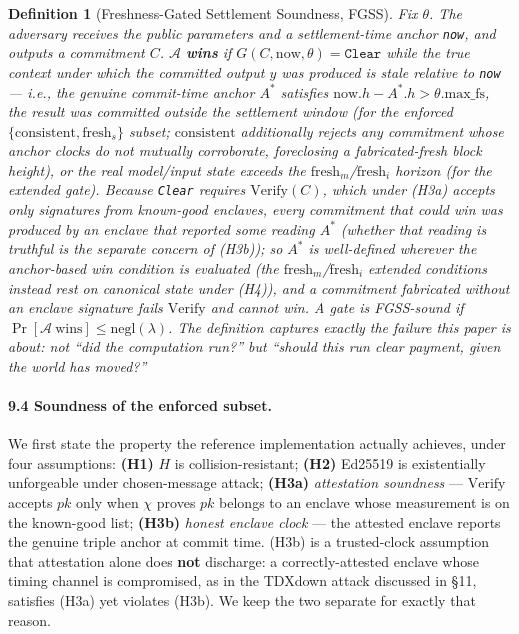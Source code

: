 \documentclass[11pt]{article}
\newtheorem*{definition}{Definition}
\begin{document}
\begin{definition}[Freshness-Gated Settlement Soundness, FGSS]
Fix $\theta$. The adversary receives the public parameters and a settlement-time anchor \texttt{now}, and outputs a commitment $C$. $\mathcal{A}$ \textbf{wins} if $G(C, \mathrm{now}, \theta) = \texttt{Clear}$ while the true context under which the committed output $y$ was produced is stale relative to \texttt{now} --- i.e., the genuine commit-time anchor $A^*$ satisfies $\mathrm{now}.h - A^*.h > \theta.\mathrm{max\_fs}$, the result was committed outside the settlement window (for the enforced $\{\mathrm{consistent}, \mathrm{fresh}_s\}$ subset; $\mathrm{consistent}$ additionally rejects any commitment whose anchor clocks do not mutually corroborate, foreclosing a fabricated-fresh block height), or the real model/input state exceeds the $\mathrm{fresh}_m$/$\mathrm{fresh}_i$ horizon (for the extended gate). Because \texttt{Clear} requires $\mathrm{Verify}(C)$, which under (H3a) accepts only signatures from known-good enclaves, every commitment that could win was produced by an enclave that reported some reading $A^*$ (whether that reading is truthful is the separate concern of (H3b)); so $A^*$ is well-defined wherever the anchor-based win condition is evaluated (the $\mathrm{fresh}_m$/$\mathrm{fresh}_i$ extended conditions instead rest on canonical state under (H4)), and a commitment fabricated without an enclave signature fails $\mathrm{Verify}$ and cannot win. A gate is \emph{FGSS-sound} if $\Pr[\mathcal{A}\ \mathrm{wins}] \le \mathrm{negl}(\lambda)$. The definition captures exactly the failure this paper is about: not ``did the computation run?'' but ``should this run clear payment, given the world has moved?''
\end{definition}

\paragraph{9.4 Soundness of the enforced subset.} We first state the property the reference implementation actually achieves, under four assumptions: \textbf{(H1)} $H$ is collision-resistant; \textbf{(H2)} Ed25519 is existentially unforgeable under chosen-message attack; \textbf{(H3a)} \emph{attestation soundness} --- $\mathrm{Verify}$ accepts $pk$ only when $\chi$ proves $pk$ belongs to an enclave whose measurement is on the known-good list; \textbf{(H3b)} \emph{honest enclave clock} --- the attested enclave reports the genuine triple anchor at commit time. (H3b) is a trusted-clock assumption that attestation alone does \textbf{not} discharge: a correctly-attested enclave whose timing channel is compromised, as in the TDXdown attack discussed in \S11, satisfies (H3a) yet violates (H3b). We keep the two separate for exactly that reason.
\end{document}
